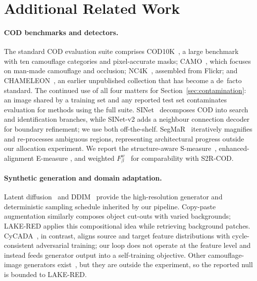 \documentclass{article} %
\begin{document}
\appendix

\section{Additional Related Work}
\label{app:related}

\paragraph{COD benchmarks and detectors.}
The standard COD evaluation suite comprises COD10K~\cite{fan2022concealed}, a large benchmark
with ten camouflage categories and pixel-accurate masks; CAMO~\cite{le2019anabranch}, which focuses
on man-made camouflage and occlusion; NC4K~\cite{lv2021simultaneously}, assembled from Flickr; and
CHAMELEON~\cite{skurowski2018animal}, an earlier unpublished collection that has become a de~facto
standard. The continued use of all four matters for Section~\ref{sec:contamination}: an image shared
by a training set and any reported test set contaminates evaluation for methods using the full suite.
SINet~\cite{fan2020sinet} decomposes COD into search and identification branches, while SINet-v2
\cite{fan2022concealed} adds a neighbour connection decoder for boundary refinement; we use both
off-the-shelf. SegMaR~\cite{jia2022segment} iteratively magnifies and re-processes ambiguous
regions, representing architectural progress outside our allocation experiment. We report the
structure-aware S-measure~\cite{fan2017structure}, enhanced-alignment E-measure
\cite{fan2018enhanced}, and weighted $F_\beta^w$~\cite{margolin2014evaluate} for comparability
with S2R-COD.

\paragraph{Synthetic generation and domain adaptation.}
Latent diffusion~\cite{rombach2022high} and DDIM~\cite{song2021denoising} provide the high-resolution
generator and deterministic sampling schedule inherited by our pipeline. Copy-paste augmentation
\cite{ghiasi2021simple} similarly composes object cut-outs with varied backgrounds; LAKE-RED applies
this compositional idea while retrieving background patches. CyCADA~\cite{hoffman2018cycada}, in
contrast, aligns source and target feature distributions with cycle-consistent adversarial training;
our loop does not operate at the feature level and instead feeds generator output into a
self-training objective. Other camouflage-image generators exist~\cite{chen2025realcamo}, but they
are outside the experiment, so the reported null is bounded to LAKE-RED.
\end{document}
